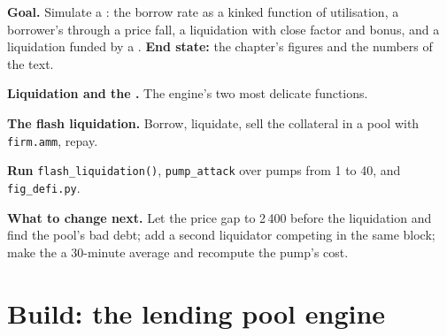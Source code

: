 \begin{tutorial}
\textbf{Goal.} Simulate a : the borrow rate as a kinked function of utilisation, a borrower's  through a price fall, a
liquidation with close factor and bonus, and a liquidation funded by a . \textbf{End state:} the chapter's figures and the numbers of the
text.
\begin{tutsteps}
\item \textbf{Liquidation and the .} The engine's two most delicate functions.
\label{lst:m3:defi-credit-and-leverage:liq}
\item \textbf{The flash liquidation.} Borrow, liquidate, sell the collateral in a pool with \texttt{firm.amm}, repay.
\label{lst:m3:defi-credit-and-leverage:flash}
\item \textbf{Run} \texttt{flash\_liquidation()}, \texttt{pump\_attack} over pumps from 1 to 40, and \texttt{fig\_defi.py}.
\end{tutsteps}
\textbf{What to change next.} Let the price gap to 2\,400 before the liquidation and find the pool's bad debt; add a second liquidator competing in the same
block; make the  a 30-minute average and recompute the pump's cost.
\end{tutorial}

\section{Build: the lending pool engine}\label{bld:m3:defi-credit-and-leverage:lendpool}

